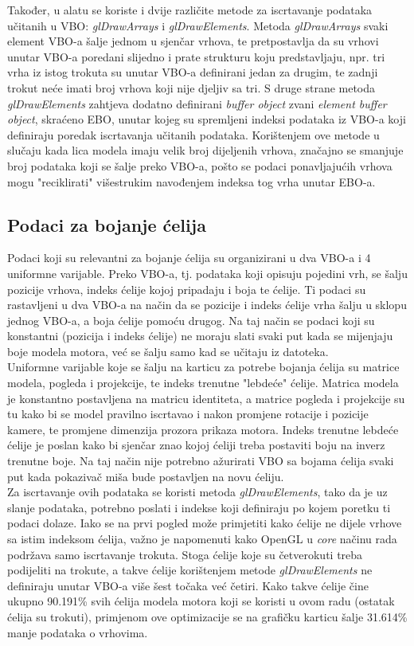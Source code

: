 \documentclass[times, utf8, diplomski]{fer}
\begin{document}
Također, u alatu se koriste i dvije različite metode za iscrtavanje podataka učitanih u VBO: \textit{glDrawArrays} i \textit{glDrawElements}. Metoda \textit{glDrawArrays} svaki element VBO-a šalje jednom u sjenčar vrhova, te pretpostavlja da su vrhovi unutar VBO-a poredani slijedno i prate strukturu koju predstavljaju, npr. tri vrha iz istog trokuta su unutar VBO-a definirani jedan za drugim, te zadnji trokut neće imati broj vrhova koji nije djeljiv sa tri. S druge strane metoda \textit{glDrawElements} zahtjeva dodatno definirani \textit{buffer object} zvani \textit{element buffer object}, skraćeno EBO, unutar kojeg su spremljeni indeksi podataka iz VBO-a koji definiraju poredak iscrtavanja učitanih podataka. Korištenjem ove metode u slučaju kada lica modela imaju velik broj dijeljenih vrhova, značajno se smanjuje broj podataka koji se šalje preko VBO-a, pošto se podaci ponavljajućih vrhova mogu "reciklirati" višestrukim navođenjem indeksa tog vrha unutar EBO-a.

\subsection{Podaci za bojanje ćelija}

Podaci koji su relevantni za bojanje ćelija su organizirani u dva VBO-a i 4 uniformne varijable. Preko VBO-a, tj. podataka koji opisuju pojedini vrh, se šalju pozicije vrhova, indeks ćelije kojoj pripadaju i boja te ćelije. Ti podaci su rastavljeni u dva VBO-a na način da se pozicije i indeks ćelije vrha šalju u sklopu jednog VBO-a, a boja ćelije pomoću drugog. Na taj način se podaci koji su konstantni (pozicija i indeks ćelije) ne moraju slati svaki put kada se mijenjaju boje modela motora, već se šalju samo kad se učitaju iz datoteka.\\

Uniformne varijable koje se šalju na karticu za potrebe bojanja ćelija su matrice modela, pogleda i projekcije, te indeks trenutne "lebdeće" ćelije. Matrica modela je konstantno postavljena na matricu identiteta, a matrice pogleda i projekcije su tu kako bi se model pravilno iscrtavao i nakon promjene rotacije i pozicije kamere, te promjene dimenzija prozora prikaza motora. Indeks trenutne lebdeće ćelije je poslan kako bi sjenčar znao kojoj ćeliji treba postaviti boju na inverz trenutne boje. Na taj način nije potrebno ažurirati VBO sa bojama ćelija svaki put kada pokazivač miša bude postavljen na novu ćeliju.\\

Za iscrtavanje ovih podataka se koristi metoda \textit{glDrawElements}, tako da je uz slanje podataka, potrebno poslati i indekse koji definiraju po kojem poretku ti podaci dolaze. Iako se na prvi pogled može primjetiti kako ćelije ne dijele vrhove sa istim indeksom ćelija, važno je napomenuti kako OpenGL u \textit{core} načinu rada podržava samo iscrtavanje trokuta. Stoga ćelije koje su četverokuti treba podijeliti na trokute, a takve ćelije korištenjem metode \textit{glDrawElements} ne definiraju unutar VBO-a više šest točaka već četiri. Kako takve ćelije čine ukupno 90.191\% svih ćelija modela motora koji se koristi u ovom radu (ostatak ćelija su trokuti), primjenom ove optimizacije se na grafičku karticu šalje 31.614\% manje podataka o vrhovima.
\end{document}
